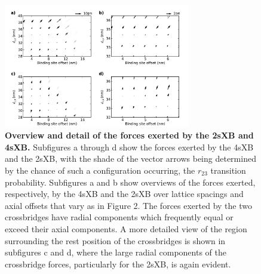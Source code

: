 \documentclass[]{article}
\begin{document}
\begin{figure}[htbp]
    \begin{center}
    \includegraphics[width=3.2in]{../imgs/Figure4.pdf}
    \caption{
        \label{fig_forces}
        \textbf{Overview and detail of the forces exerted by the 2sXB and 4sXB.}
        Subfigures a through d show the forces exerted by the 4sXB and the 2sXB, with the shade of the vector arrows being determined by the chance of such a configuration occurring, the $r_{23}$ transition probability. 
        Subfigures a and b show overviews of the forces exerted, respectively, by the 4sXB and the 2sXB over lattice spacings and axial offsets that vary as in Figure 2.
        The forces exerted by the two crossbridges have radial components which frequently equal or exceed their axial components.
        A more detailed view of the region surrounding the rest position of the crossbridges is shown in subfigures c and d, where the large radial components of the crossbridge forces, particularly for the 2sXB, is again evident.
    }
    \end{center}
\end{figure}

% 




\clearpage


\end{document}
